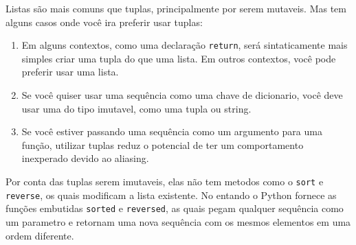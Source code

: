 Listas são mais comuns que tuplas, principalmente por serem mutaveis.
Mas tem alguns casos onde você ira preferir usar tuplas:

\begin{enumerate}

\item Em alguns contextos, como uma declaração {\tt return}, será
sintaticamente mais simples criar uma tupla do que uma lista. Em 
outros contextos, você pode preferir usar uma lista.

\item Se você quiser usar uma sequência como uma chave de dicionario,
você deve usar uma do tipo imutavel, como uma tupla ou string.

\item Se você estiver passando uma sequência como um argumento para
uma função, utilizar tuplas reduz o potencial de ter um comportamento
inexperado devido ao aliasing.

\end{enumerate}

Por conta das tuplas serem imutaveis, elas não tem metodos como o
{\tt sort} e {\tt reverse}, os quais modificam a lista existente.
No entando o Python fornece as funções embutidas {\tt sorted}
e {\tt reversed}, as quais pegam qualquer sequência como um parametro
e retornam uma nova sequência com os mesmos elementos em uma ordem
diferente.


